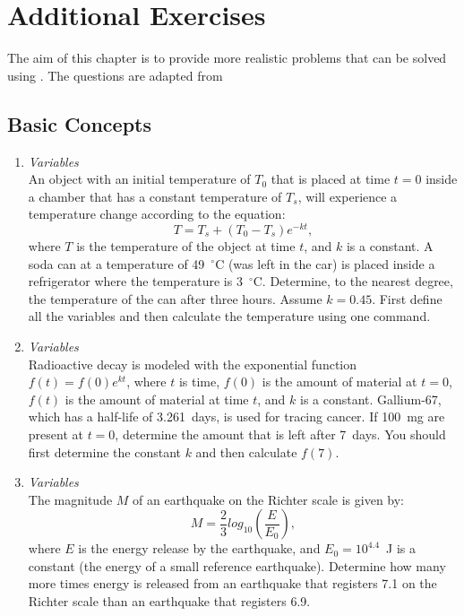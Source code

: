 \chapter{Additional Exercises}
The aim of this chapter is to provide more realistic problems that can be solved using \mlab. The questions are adapted from \gilatbook
\section{Basic Concepts} \label{sect:basic_concepts}
\begin{enumerate}
\item \textit{Variables}\\
An object with an initial temperature of $T_0$ that is placed at time $t=0$ inside a chamber that has a constant temperature of $T_s$, will experience a temperature change according to the equation:
\begin{equation*}
T = T_s + (T_0 - T_s)e^{-kt},
\end{equation*}
where $T$ is the temperature of the object at time $t$, and $k$ is a constant. A soda can at a temperature of 49~$^\circ$C (was left in the car) is placed inside a refrigerator where the temperature is 3~$^\circ$C. Determine, to the nearest degree, the temperature of the can after three hours. Assume $k=0.45$. First define all the variables and then calculate the temperature using one \mlab command.

\item \textit{Variables}\\
Radioactive decay is modeled with the exponential function $f(t) = f(0)e^{kt}$, where $t$ is time, $f(0)$ is the amount of material at $t=0$, $f(t)$ is the amount of material at time $t$, and $k$ is a constant. Gallium-67, which has a half-life of 3.261~days, is used for tracing cancer. If 100~mg are present at $t=0$, determine the amount that is left after 7~days. You should first determine the constant $k$ and then calculate $f(7)$. 

\item \textit{Variables}\\
The magnitude $M$ of an earthquake on the Richter scale is given by:
\begin{equation*}
M = \frac{2}{3} log_{10} \left( \frac{E}{E_0} \right),
\end{equation*}
where $E$ is the energy release by the earthquake, and $E_0 = 10^{4.4}$~J is a constant (the energy of a small reference earthquake). Determine how many more times energy is released from an earthquake that registers 7.1 on the Richter scale than an earthquake that registers 6.9.


\end{enumerate}

